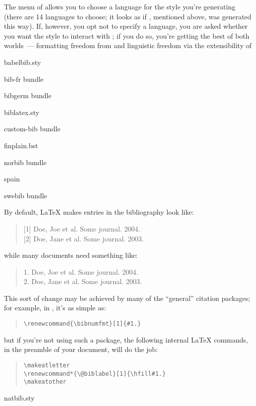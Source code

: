 The  menu of  allows you to
choose a language for the \BibTeX{} style you're generating (there are
14 languages to choose; it looks as if , mentioned
above, was generated this way).  If, however, you opt not to specify a
language, you are asked whether you want the style to interact with
; if you do so, you're getting the best of both
worlds~--- formatting freedom from  and linguistic
freedom via the extensibility of 
\begin{ctanrefs}
\item[babelbib.sty]
\item[bib-fr \nothtml{\rmfamily\upshape}bundle]
\item[bibgerm \nothtml{\rmfamily\upshape}bundle]
\item[biblatex.sty]
\item[custom-bib \nothtml{\rmfamily\upshape}bundle]
\item[finplain.bst]
\item[norbib \nothtml{\rmfamily\upshape}bundle]
\item[spain]
\item[swebib \nothtml{\rmfamily\upshape}bundle]
\end{ctanrefs}


By default, \LaTeX{} makes entries in the bibliography look like:
\begin{quote}
  [1] Doe, Joe et al.  Some journal.  2004.\\ {}
  [2] Doe, Jane et al. Some journal. 2003.
\end{quote}
while many documents need something like:
\begin{quote}
  1. Doe, Joe et al.  Some journal.  2004.\\
  2. Doe, Jane et al. Some journal. 2003.
\end{quote}

This sort of change may be achieved by many of the ``general''
citation packages; for example, in , it's as simple as:
\begin{quote}
\begin{verbatim}
\renewcommand{\bibnumfmt}[1]{#1.}
\end{verbatim}
\end{quote}
but if you're not using such a package, the following internal
\LaTeX{} commands, in the preamble of your document, will do the job:
\begin{quote}
\begin{verbatim}
\makeatletter
\renewcommand*{\@biblabel}[1]{\hfill#1.}
\makeatother
\end{verbatim}
\end{quote}
\begin{ctanrefs}
\item[natbib.sty]
\end{ctanrefs}

